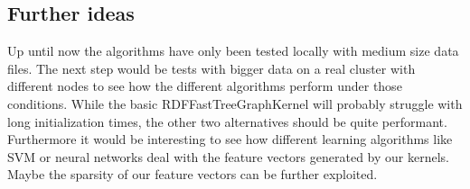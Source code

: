 \documentclass{easychair}
\begin{document}
\subsection{Further ideas}
Up until now the algorithms have only been tested locally with medium size data files. The next step would be tests with bigger data on a real cluster with different nodes to see how the different algorithms perform under those conditions. While the basic RDFFastTreeGraphKernel will probably struggle with long initialization times, the other two alternatives should be quite performant. Furthermore it would be interesting to see how different learning algorithms like SVM or neural networks deal with the feature vectors generated by our kernels. Maybe the sparsity of our feature vectors can be further exploited.



%
\label{sect:bib}

%
%
%



\end{document}
